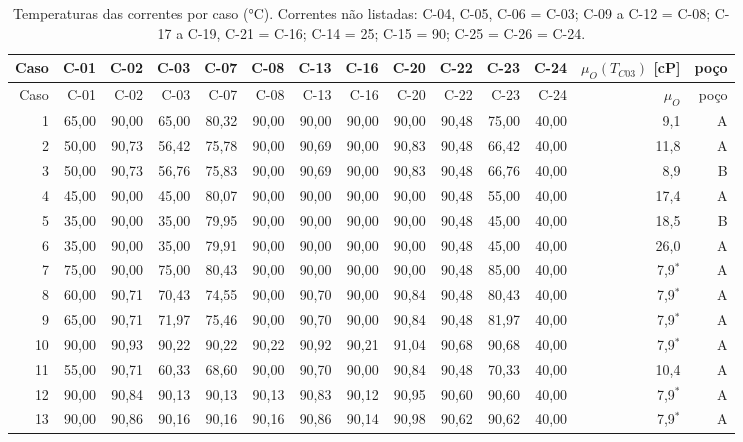 \documentclass[11pt,a4paper]{article}
\numberwithin{equation}{section}
\numberwithin{table}{section}
\numberwithin{figure}{section}
\begin{document}
\begin{landscape}\small
\begin{longtable}{rrrrrrrrrrrrrr}
\caption{Temperaturas das correntes por caso (\si{\celsius}). Correntes não listadas: C-04, C-05, C-06 = C-03; C-09 a C-12 = C-08; C-17 a C-19, C-21 = C-16; C-14 = 25; C-15 = 90; C-25 = C-26 = C-24.}\label{tab:temps}\\\toprule
Caso & C-01 & C-02 & C-03 & C-07 & C-08 & C-13 & C-16 & C-20 & C-22 & C-23 & C-24 & $\mu_O(T_{C03})$ [cP] & poço\\\midrule\endfirsthead
\toprule Caso & C-01 & C-02 & C-03 & C-07 & C-08 & C-13 & C-16 & C-20 & C-22 & C-23 & C-24 & $\mu_O$ & poço\\\midrule\endhead

1 & 65,00 & 90,00 & 65,00 & 80,32 & 90,00 & 90,00 & 90,00 & 90,00 & 90,48 & 75,00 & 40,00 & 9,1 & A\\
2 & 50,00 & 90,73 & 56,42 & 75,78 & 90,00 & 90,69 & 90,00 & 90,83 & 90,48 & 66,42 & 40,00 & 11,8 & A\\
3 & 50,00 & 90,73 & 56,76 & 75,83 & 90,00 & 90,69 & 90,00 & 90,83 & 90,48 & 66,76 & 40,00 & 8,9 & B\\
4 & 45,00 & 90,00 & 45,00 & 80,07 & 90,00 & 90,00 & 90,00 & 90,00 & 90,48 & 55,00 & 40,00 & 17,4 & A\\
5 & 35,00 & 90,00 & 35,00 & 79,95 & 90,00 & 90,00 & 90,00 & 90,00 & 90,48 & 45,00 & 40,00 & 18,5 & B\\
6 & 35,00 & 90,00 & 35,00 & 79,91 & 90,00 & 90,00 & 90,00 & 90,00 & 90,48 & 45,00 & 40,00 & 26,0 & A\\
7 & 75,00 & 90,00 & 75,00 & 80,43 & 90,00 & 90,00 & 90,00 & 90,00 & 90,48 & 85,00 & 40,00 & 7,9$^*$ & A\\
8 & 60,00 & 90,71 & 70,43 & 74,55 & 90,00 & 90,70 & 90,00 & 90,84 & 90,48 & 80,43 & 40,00 & 7,9$^*$ & A\\
9 & 65,00 & 90,71 & 71,97 & 75,46 & 90,00 & 90,70 & 90,00 & 90,84 & 90,48 & 81,97 & 40,00 & 7,9$^*$ & A\\
10 & 90,00 & 90,93 & 90,22 & 90,22 & 90,22 & 90,92 & 90,21 & 91,04 & 90,68 & 90,68 & 40,00 & 7,9$^*$ & A\\
11 & 55,00 & 90,71 & 60,33 & 68,60 & 90,00 & 90,70 & 90,00 & 90,84 & 90,48 & 70,33 & 40,00 & 10,4 & A\\
12 & 90,00 & 90,84 & 90,13 & 90,13 & 90,13 & 90,83 & 90,12 & 90,95 & 90,60 & 90,60 & 40,00 & 7,9$^*$ & A\\
13 & 90,00 & 90,86 & 90,16 & 90,16 & 90,16 & 90,86 & 90,14 & 90,98 & 90,62 & 90,62 & 40,00 & 7,9$^*$ & A\\

\end{longtable}
\end{landscape}
\end{document}
